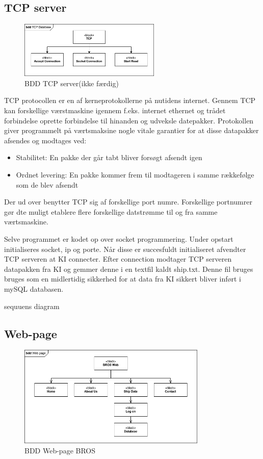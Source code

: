 \subsection{TCP server}
\begin{figure}[htbp]
	\centering
	\includegraphics[width=0.6\textwidth]{billeder/bdd_TCP_server}
	\caption{BDD TCP server(ikke færdig)}
	\label{fig:bdd_TCP_server}
\end{figure}

TCP protocollen er en af kerneprotokollerne på nutidens internet. Gennem TCP kan forskellige værstmaskine igennem f.eks. internet ethernet og trådet forbindelse oprette forbindelse til hinanden og udveksle datepakker. Protokollen giver programmelt på værtsmaksine nogle vitale garantier for at disse datapakker afsendes og modtages ved:
\begin{itemize}
	\item Stabilitet: En pakke der går tabt bliver forsøgt afsendt igen
	\item Ordnet levering: En pakke kommer frem til modtageren i samme rækkefølge som de blev afsendt
\end{itemize}
Der ud over benytter TCP sig af forskellige port numre. Forskellige portnumrer gør dte muligt etablere flere forskellige datstrømme til og fra samme værtsmaskine.

Selve programmet er kodet op over socket programmering. Under opstart initialiseres socket, ip og porte. Når disse er succesfuldt initialiseret afvendter TCP serveren at KI connecter. Efter connection modtager TCP serveren datapakken fra KI og gemmer denne i en textfil kaldt ship.txt. Denne fil bruges bruges som en midlertidig sikkerhed for at data fra KI sikkert bliver inført i mySQL databasen.

sequuens diagram

\subsection{Web-page}
\begin{figure}[htbp]
	\centering
	\includegraphics[width=0.8\textwidth]{billeder/bdd_web}
	\caption{BDD Web-page BROS}
	\label{fig:bdd_web}
\end{figure}

